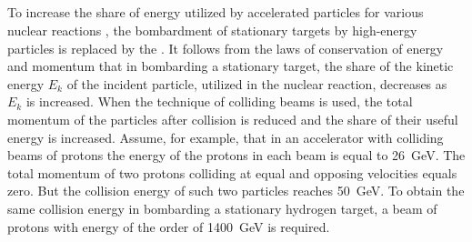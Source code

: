 \subsection{}\label{24.4.13} To increase the share of energy utilized by accelerated particles for various nuclear reactions , the bombardment of stationary targets by high-energy particles is replaced by the . It follows from the laws of conservation of energy  and momentum  that in bombarding a stationary target, the share of the kinetic energy $E_{k}$ of the incident particle, utilized in the nuclear reaction, decreases as $E_{k}$ is increased. When the technique of colliding beams is used, the total momentum of the particles after collision is reduced and the share of their useful energy is increased. Assume, for example, that in an accelerator with colliding beams of protons the energy of the protons in each beam is equal to \SI{26}{\giga\electronvolt}. The total momentum of two protons colliding at equal and opposing velocities equals zero. But the collision energy of such two particles reaches \SI{50}{\giga\electronvolt}. To obtain the same collision energy in bombarding a stationary hydrogen target, a beam of protons with energy of the order of \SI{1400}{\giga\electronvolt} is required.



